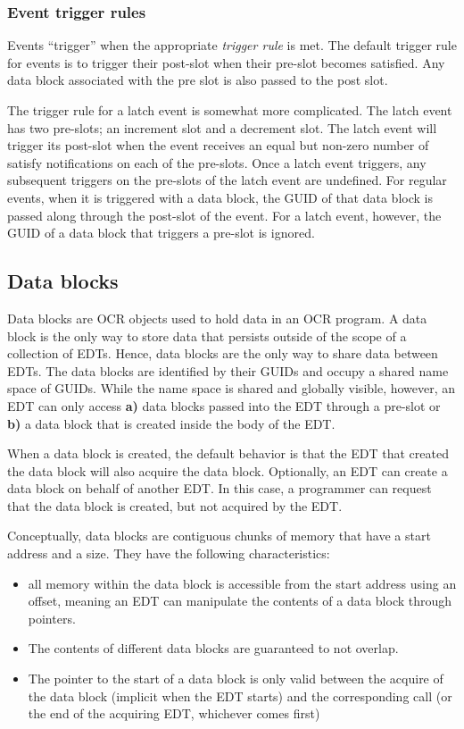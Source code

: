 \subsubsection{Event trigger rules}
Events ``trigger'' when the appropriate \emph{trigger
rule} is met. The default trigger rule for events
is to trigger their post-slot when their pre-slot becomes
satisfied. Any data block associated with the pre slot is also passed
to the post slot.

The trigger rule for a latch event is somewhat more complicated. The
latch event has two pre-slots; an increment slot and a decrement
slot. The latch event will trigger its post-slot when the event
receives an equal but non-zero number of satisfy notifications on each
of the pre-slots. Once a latch event triggers, any subsequent
triggers on the pre-slots of the latch event are undefined. For
regular events, when it is triggered with a data block, the GUID of
that data block is passed along through the post-slot of the
event. For a latch event, however, the GUID of a data block that
triggers a pre-slot is ignored.

\subsection{Data blocks}
\label{sec:datablocks}
Data blocks are OCR objects used to hold data in an OCR program. A
data block is the only way to store data that persists outside of the
scope of a collection of EDTs. Hence, data blocks are the only way to
share data between EDTs. The data blocks are identified by their
GUIDs and occupy a shared name space of GUIDs. While the name space
is shared and globally visible, however, an EDT can only access {\bf a)}
data blocks passed into the EDT through a pre-slot or {\bf b)} a data block
that is created inside the body of the EDT.

When a data block is created, the default behavior is that the EDT
that created the data block will also acquire the data block.
Optionally, an EDT can
create a data block on behalf of another EDT. In this case, a
programmer can request that the data block is created, but not
acquired by the EDT.

Conceptually, data blocks are contiguous chunks of memory
that have a start address and a size. They have the following characteristics:
\begin{itemize}
\item all memory within the data block is accessible from the
start address using an offset, meaning an EDT can manipulate the
contents of a data block through pointers.
\item The contents of different data blocks are guaranteed to not
overlap.
\item The pointer to the start of a data block is only valid between
the acquire of the data block (implicit when the EDT starts) and the
corresponding  call (or the end of the acquiring
EDT, whichever comes first)
\end{itemize}


